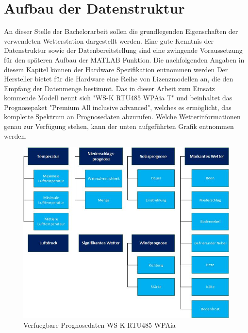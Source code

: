 \section{Aufbau der Datenstruktur}
An dieser Stelle der Bachelorarbeit sollen die grundlegenden Eigenschaften der verwendeten Wetterstation dargestellt werden. Eine gute Kenntnis der Datenstruktur sowie der Datenbereitstellung sind eine zwingende Voraussetzung für den späteren Aufbau der MATLAB Funktion. Die nachfolgenden Angaben in diesem Kapitel können der Hardware Spezifikation entnommen werden \cite{HWKDoc} Der Hersteller bietet für die Hardware eine Reihe von Lizenzmodellen an, die den Empfang der Datenmenge bestimmt. Das in dieser Arbeit zum Einsatz kommende Modell nennt sich "{}WS-K RTU485 WPAia T"{} und beinhaltet das Prognosepaket "Premium All inclusive advanced", welches es ermöglicht, das komplette Spektrum an Prognosedaten abzurufen. Welche Wetterinformationen genau zur Verfügung stehen, kann der unten aufgeführten Grafik entnommen werden.
\begin{figure}[h]
\centering
\includegraphics[scale=0.65]{weatherstation/Datenuebersicht}
\caption{Verfuegbare Prognosedaten WS-K RTU485 WPAia}
\label{fig:1}
\end{figure}
